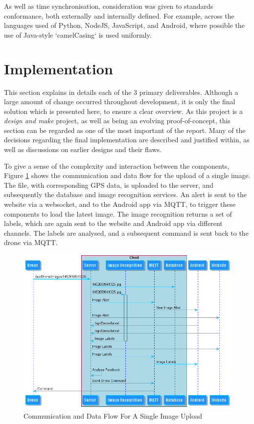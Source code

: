 \documentclass{article}
\begin{document}
As well as time synchronisation, consideration was given to standards conformance, both externally and internally defined. For example, across the languages used of Python, NodeJS, JavaScript, and Android, where possible the use of Java-style `camelCasing` is used uniformly.

\section{Implementation}
This section explains in details each of the 3 primary deliverables. Although a large amount of change occurred throughout development, it is only the final solution which is presented here, to ensure a clear overview. As this project is a \textit{design and make} project, as well as being an evolving proof-of-concept, this section can be regarded as one of the most important of the report. Many of the decisions regarding the final implementation are described and justified within, as well as discussions on earlier designs and their flaws. 

To give a sense of the complexity and interaction between the components, Figure \ref{fig:CommSingleUpload} shows the communication and data flow for the upload of a single image. The file, with corresponding GPS data, is uploaded to the server, and subsequently the database and image recognition services. An alert is sent to the website via a websocket, and to the Android app via MQTT, to trigger these components to load the latest image. The image recognition returns a set of labels, which are again sent to the website and Android app via different channels. The labels are analysed, and a subsequent command is sent back to the drone via MQTT.

\begin{figure}[h]
\centering
\caption{Communication and Data Flow For A Single Image Upload\label{fig:CommSingleUpload}}
\includegraphics[width=\textwidth]{CommSingleUpload}
\end{figure}
 
\end{document}
